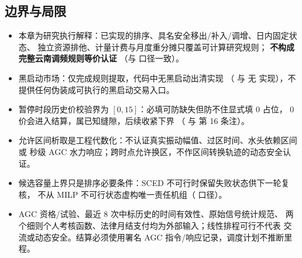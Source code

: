 \subsection{边界与局限}
\begin{itemize}
  \item 本章为研究执行解释：已实现的排序、具名安全移出/补入/调增、日内固定状态、
        独立资源排他、计量计费与月度重分摊只覆盖可计算研究规则；
        \textbf{不构成完整云南调频规则等价认证}
        （与  口径一致）。
  \item 黑启动市场：仅完成规则提取，代码中无黑启动出清实现
        （ 与  无 
        实现），不提供任何伪装成可执行的黑启动交易入口。
  \item 暂停时段历史价校验界为 $[0,15]$：必填可防缺失但防不住显式填 0 占位，
        0 价会进入结算，属已知缝隙，后续收紧下界
        （ 与
         第 16 条注）。
  \item 允许区间析取是工程代数化：不认证真实振动幅值、过区时间、水头依赖区间或
        秒级 AGC 水力响应；跨时点允许换区，不作区间转换轨迹的动态安全认证。
  \item 候选容量上界只是排序必要条件：SCED 不可行时保留失败状态供下一轮复核，
        不从 MILP 不可行状态虚构唯一责任机组（ 口径）。
  \item AGC 资格/试验、最近 8 次中标历史的时间有效性、原始信号统计规范、
        两个细则个人考核函数、法律月结支付均为外部输入；线性排程可行不代表
        交流或动态安全。结算必须使用署名 AGC 指令/响应记录，调度计划不推断里程。
\end{itemize}
